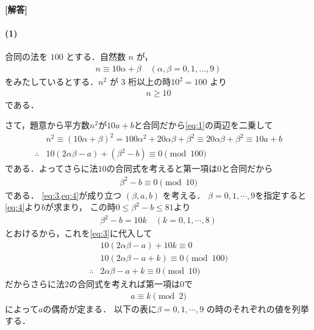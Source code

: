 \documentclass[../../main.tex]{subfiles}
\begin{document}
\begin{oframed}
  
\end{oframed}

{\bf [解答]}
\paragraph{(1)}

合同の法を $100$ とする．自然数 $n$ が，
\begin{align}
  n \equiv 10\alpha + \beta \quad (\alpha, \beta = 0, 1, \dots, 9) \label{eq:1}
\end{align}
をみたしているとする．$n^2$ が 3 桁以上の時$10^2 = 100$ より
\begin{align}
  n \ge 10 \label{eq:2}
\end{align}
である．

さて，題意から平方数$n^2$が$10a+b$と合同だから\cref{eq:1}の両辺を二乗して
\begin{align}
  & n^2 \equiv (10\alpha+\beta)^2
  = 100\alpha^2+20\alpha\beta+\beta^2
  \equiv 20\alpha\beta+\beta^2
  \equiv 10a+b \\
  \therefore
  & 10(2\alpha\beta - a) + (\beta^2 - b) \equiv 0 \pmod{100} \label{eq:3}
\end{align}
である．よってさらに法$10$の合同式を考えると第一項は$0$と合同だから
\begin{align}
  \beta^2 - b \equiv 0 \pmod{10} \label{eq:4}
\end{align}
である．
\cref{eq:3,eq:4}が成り立つ $(\beta,a,b)$ を考える．
$\beta=0,1,\cdots,9$を指定すると\cref{eq:4}より$b$が求まり，
この時$0 \le  \beta^2 - b \le 81$より
\begin{align}
  \beta^2 - b = 10k \quad (k=0,1,\cdots,8) \label{eq:5}
\end{align}
とおけるから，これを\cref{eq:3}に代入して
\begin{align}
  & 10(2\alpha\beta - a) + 10k \equiv 0 \\
  & 10\left(2\alpha\beta - a + k\right) \equiv 0 \pmod{100} \\
  \therefore
  & 2\alpha\beta - a + k \equiv 0 \pmod{10}
\end{align}
だからさらに法$2$の合同式を考えれば第一項は$0$で
\begin{align}
  a \equiv k \pmod{2} \label{eq:6}
\end{align}
によって$a$の偶奇が定まる．
以下の表に$\beta=0,1,\cdots,9$ の時のそれぞれの値を列挙する．
\end{document}
